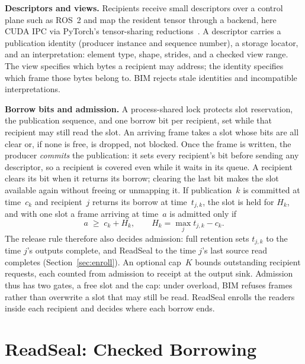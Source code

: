 \documentclass[conference]{IEEEtran}
\begin{document}
\textbf{Descriptors and views.} Recipients receive small descriptors over a control plane such as ROS~2 and map the resident tensor through a backend, here CUDA IPC via PyTorch's tensor-sharing reductions~\cite{torchmp}. A descriptor carries a publication identity (producer instance and sequence number), a storage locator, and an interpretation: element type, shape, strides, and a checked view range. The view specifies which bytes a recipient may address; the identity specifies which frame those bytes belong to. BIM rejects stale identities and incompatible interpretations.

\textbf{Borrow bits and admission.} A process-shared lock protects slot reservation, the publication sequence, and one borrow bit per recipient, set while that recipient may still read the slot. An arriving frame takes a slot whose bits are all clear or, if none is free, is dropped, not blocked. Once the frame is written, the producer \emph{commits} the publication: it sets every recipient's bit before sending any descriptor, so a recipient is covered even while it waits in its queue. A recipient clears its bit when it returns its borrow; clearing the last bit makes the slot available again without freeing or unmapping it. If publication~$k$ is committed at time~$c_k$ and recipient~$j$ returns its borrow at time~$t_{j,k}$, the slot is held for $H_k$, and with one slot a frame arriving at time~$a$ is admitted only if
\begin{equation}
a\;\ge\; c_k+H_k, \qquad H_k=\max_j t_{j,k}-c_k. \label{eq:hold}
\end{equation} The release rule therefore also decides admission: full retention sets $t_{j,k}$ to the time $j$'s outputs complete, and ReadSeal to the time $j$'s last source read completes (Section~\ref{sec:enroll}). An optional cap~$K$ bounds outstanding recipient requests, each counted from admission to receipt at the output sink. Admission thus has two gates, a free slot and the cap: under overload, BIM refuses frames rather than overwrite a slot that may still be read. ReadSeal enrolls the readers inside each recipient and decides where each borrow ends.

\section{ReadSeal: Checked Borrowing}
\label{sec:readseal}
\end{document}
